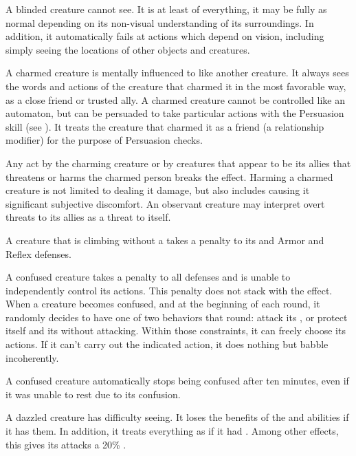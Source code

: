      A blinded creature cannot see.
    It is at least \partiallyunaware of everything, it may be fully \unaware as normal depending on its non-visual understanding of its surroundings.
    In addition, it automatically fails at actions which depend on vision, including simply seeing the locations of other objects and creatures.

     A charmed creature is mentally influenced to like another creature.
    It always sees the words and actions of the creature that charmed it in the most favorable way, as a close friend or trusted ally.
    A charmed creature cannot be controlled like an automaton, but can be persuaded to take particular actions with the Persuasion skill (see ).
    It treats the creature that charmed it as a friend (a  relationship modifier) for the purpose of Persuasion checks.

    Any act by the charming creature or by creatures that appear to be its allies that threatens or harms the charmed person breaks the effect.
    Harming a charmed creature is not limited to dealing it damage, but also includes causing it significant subjective discomfort.
    An observant creature may interpret overt threats to its allies as a threat to itself.

     A creature that is climbing without a  takes a  penalty to its  and Armor and Reflex defenses.

     A confused creature takes a  penalty to all defenses and is unable to independently control its actions.
    This penalty does not stack with the \stunned effect.
    When a creature becomes confused, and at the beginning of each round, it randomly decides to have one of two behaviors that round: attack its , or protect itself and its  without attacking.
    Within those constraints, it can freely choose its actions.
    If it can't carry out the indicated action, it does nothing but babble incoherently.

    A confused creature automatically stops being confused after ten minutes, even if it was unable to rest due to its confusion.

     A dazzled creature has difficulty seeing.
    It loses the benefits of the  and  abilities if it has them.
    In addition, it treats everything as if it had .
    Among other effects, this gives its  attacks a 20\% .

